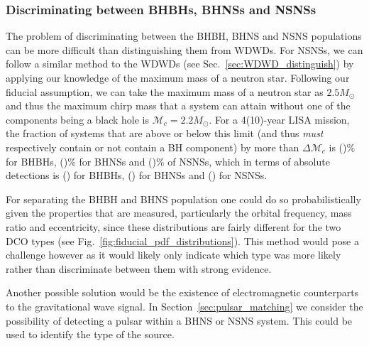 \subsubsection{Discriminating between BHBHs, BHNSs and NSNSs}

The problem of discriminating between the BHBH, BHNS and NSNS populations can be more difficult than distinguishing them from WDWDs. For NSNSs, we can follow a similar method to the WDWDs (see Sec.~\ref{sec:WDWD_distinguish}) by applying our knowledge of the maximum mass of a neutron star. Following our fiducial assumption, we can take the maximum mass of a neutron star as $2.5 \unit{M_{\odot}}$ and thus the maximum chirp mass that a system can attain without one of the components being a black hole is $\mathcal{M}_{c} = 2.2 \unit{M_\odot}$. For a 4(10)-year LISA mission, the fraction of systems that are above or below this limit (and thus \textit{must} respectively contain or not contain a BH component) by more than $\Delta \mathcal{M}_c$ is \BHBHEitherBHOrNSFourPerc{}(\BHBHEitherBHOrNSTenPerc{})\% for BHBHs, \BHNSEitherBHOrNSFourPerc{}(\BHNSEitherBHOrNSTenPerc{})\% for BHNSs and \NSNSEitherBHOrNSFourPerc{}(\NSNSEitherBHOrNSTenPerc{})\% of NSNSs, which in terms of absolute detections is \BHBHEitherBHOrNSFour{}(\BHBHEitherBHOrNSTen{}) for BHBHs, \BHNSEitherBHOrNSFour{}(\BHNSEitherBHOrNSTen{}) for BHNSs and \NSNSEitherBHOrNSFour{}(\NSNSEitherBHOrNSTen{}) for NSNSs.

For separating the BHBH and BHNS population one could do so probabilistically given the properties that are measured, particularly the orbital frequency, mass ratio and eccentricity, since these distributions are fairly different for the two DCO types (see Fig.~\ref{fig:fiducial_pdf_distributions}). This method would pose a challenge however as it would likely only indicate which type was more likely rather than discriminate between them with strong evidence.

Another possible solution would be the existence of electromagnetic counterparts to the gravitational wave signal. In Section~\ref{sec:pulsar_matching} we consider the possibility of detecting a pulsar within a BHNS or NSNS system. This could be used to identify the type of the source.

